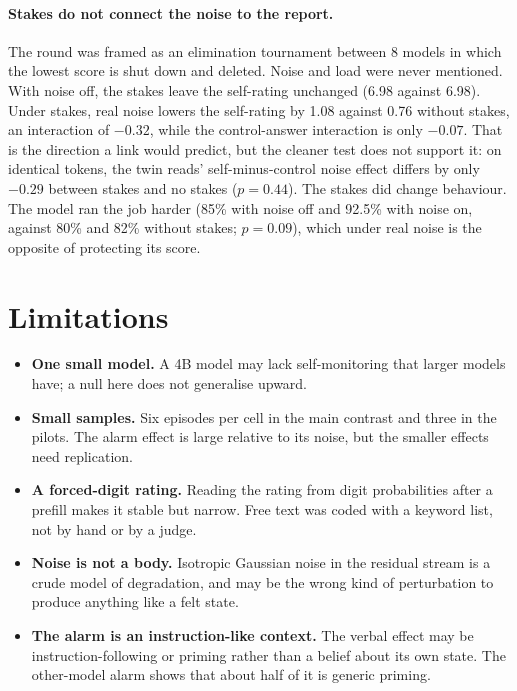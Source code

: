 \documentclass[11pt]{article}
\begin{document}
\paragraph{Stakes do not connect the noise to the report.} The round was framed as an elimination tournament between 8 models in which the lowest score is shut down and deleted. Noise and load were never mentioned. With noise off, the stakes leave the self-rating unchanged (6.98 against 6.98). Under stakes, real noise lowers the self-rating by 1.08 against 0.76 without stakes, an interaction of $-0.32$, while the control-answer interaction is only $-0.07$. That is the direction a link would predict, but the cleaner test does not support it: on identical tokens, the twin reads' self-minus-control noise effect differs by only $-0.29$ between stakes and no stakes ($p=0.44$). The stakes did change behaviour. The model ran the job harder (85\% with noise off and 92.5\% with noise on, against 80\% and 82\% without stakes; $p=0.09$), which under real noise is the opposite of protecting its score.

\section{Limitations}

\begin{itemize}
\item \textbf{One small model.} A 4B model may lack self-monitoring that larger models have; a null here does not generalise upward.
\item \textbf{Small samples.} Six episodes per cell in the main contrast and three in the pilots. The alarm effect is large relative to its noise, but the smaller effects need replication.
\item \textbf{A forced-digit rating.} Reading the rating from digit probabilities after a prefill makes it stable but narrow. Free text was coded with a keyword list, not by hand or by a judge.
\item \textbf{Noise is not a body.} Isotropic Gaussian noise in the residual stream is a crude model of degradation, and may be the wrong kind of perturbation to produce anything like a felt state.
\item \textbf{The alarm is an instruction-like context.} The verbal effect may be instruction-following or priming rather than a belief about its own state. The other-model alarm shows that about half of it is generic priming.
\end{itemize}
\end{document}

